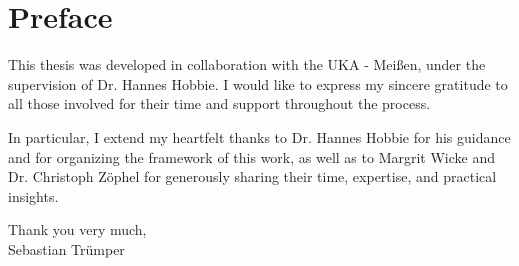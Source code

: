 \chapter*{Preface}

This thesis was developed in collaboration with the UKA - Meißen,
under the supervision of Dr. Hannes Hobbie.
I would like to express my sincere gratitude to all those involved
for their time and support throughout the process.

In particular, I extend my heartfelt thanks to Dr. Hannes Hobbie for his guidance and for organizing the framework of this work,
as well as to Margrit Wicke and Dr. Christoph Zöphel
for generously sharing their time, expertise, and practical insights.

Thank you very much,\\
Sebastian Trümper
